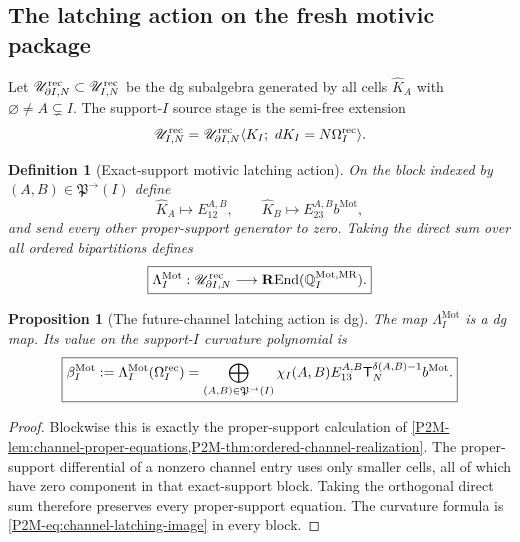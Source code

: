 \documentclass[11pt]{article}
\newtheorem{proposition}[theorem]{Proposition}
\newtheorem{definition}[theorem]{Definition}
\theoremstyle{remark}
\newcommand{\REnd}{\mathbf R\!\operatorname{End}}
\newcommand{\Mot}{\mathrm{Mot}}
\newcommand{\MR}{\mathrm{MR}}
\begin{document}
\subsection{The latching action on the fresh motivic package}

Let $\mathscr U_{\partial I,N}^{\rm rec}\subset
\mathscr U_{I,N}^{\rm rec}$ be the dg subalgebra generated by all cells
$\widehat K_A$ with $\varnothing\ne A\subsetneq I$.  The support-$I$ source
stage is the semi-free extension
\begin{equation}\label{P2M-eq:v20-source-moore-attachment}
 \mathscr U_{I,N}^{\rm rec}
 =
 \mathscr U_{\partial I,N}^{\rm rec}
 \langle K_I;\ dK_I=N\Omega_I^{\rm rec}\rangle.
\end{equation}

\begin{definition}[Exact-support motivic latching action]
\label{P2M-def:v20-exact-support-latching-action}
On the block indexed by $(A,B)\in\mathfrak P^\to(I)$ define
\[
 \widehat K_A\longmapsto E_{12}^{A,B},
 \qquad
 \widehat K_B\longmapsto E_{23}^{A,B}b^{\Mot},
\]
and send every other proper-support generator to zero.  Taking the direct sum
over all ordered bipartitions defines
\begin{equation}\label{P2M-eq:v20-exact-support-latching-action}
 \boxed{
 \Lambda_I^{\Mot}:
 \mathscr U_{\partial I,N}^{\rm rec}
 \longrightarrow
 \REnd(\mathbb Q_I^{\Mot,\MR}).}
\end{equation}
\end{definition}

\begin{proposition}[The future-channel latching action is dg]
\label{P2M-prop:v20-latching-action-dg}
The map $\Lambda_I^{\Mot}$ is a dg map.  Its value on the support-$I$
curvature polynomial is
\begin{equation}
 \boxed{
 \beta_I^{\Mot}
 :=
 \Lambda_I^{\Mot}(\Omega_I^{\rm rec})
 =
 \bigoplus_{(A,B)\in\mathfrak P^\to(I)}
 \chi_I(A,B)
 E_{13}^{A,B}\mathsf T_N^{\delta(A,B)-1}b^{\Mot}.}
\end{equation}
\end{proposition}

\begin{proof}
Blockwise this is exactly the proper-support calculation of
\cref{P2M-lem:channel-proper-equations,P2M-thm:ordered-channel-realization}.  The
proper-support differential of a nonzero channel entry uses only smaller
cells, all of which have zero component in that exact-support block.  Taking
the orthogonal direct sum therefore preserves every proper-support equation.
The curvature formula is \eqref{P2M-eq:channel-latching-image} in every block.
\end{proof}
\end{document}
